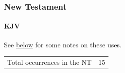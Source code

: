 			
		
		
	\subsubsection{New Testament} %
		\label{DAMNATION-NT}
	
		\paragraph{KJV}
			\label{DAMNATION-NT-KJV}
			
			See \hyperref[DAMNATION-new-testament]{below} for some notes on these uses.
	
			\begin{tabular}{ll}
				Total occurrences in the NT & 15
			\end{tabular}
			
